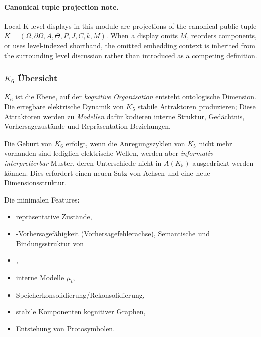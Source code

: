



\paragraph{Canonical tuple projection note.}
Local K-level displays in this module are projections of the canonical public tuple \(K=(\Omega,\partial\Omega,A,\Theta,P,J,C,k,M)\). When a display omits \(M\), reorders components, or uses level-indexed shorthand, the omitted embedding context is inherited from the surrounding level discussion rather than introduced as a competing definition.

\subsubsection{\texorpdfstring{$K_6$}{K_6} Übersicht}
\label{sec:k6-overview}

$K_6$ ist die Ebene, auf der \emph{kognitive Organisation} entsteht
ontologische Dimension. Die erregbare elektrische Dynamik von $K_5$
stabile Attraktoren produzieren; Diese Attraktoren werden zu \emph{Modellen} dafür
kodieren interne Struktur, Gedächtnis, Vorhersagezustände und Repräsentation
Beziehungen.

Die Geburt von $K_6$ erfolgt, wenn die Anregungszyklen von $K_5$ nicht mehr vorhanden sind
lediglich elektrische Wellen, werden aber \emph{informativ interpretierbar}
Muster, deren Unterschiede nicht in $A(K_5)$ ausgedrückt werden können. Dies
erfordert einen neuen Satz von Achsen und eine neue Dimensionsstruktur.

Die minimalen Features:
\begin{itemize}
    \item repräsentative Zustände,
    \item-Vorhersagefähigkeit (Vorhersagefehlerachse),
    Semantische und Bindungsstruktur von \item,
    \item interne Modelle $\mu_t$,
    \item Speicherkonsolidierung/Rekonsolidierung,
    \item stabile Komponenten kognitiver Graphen,
    \item Entstehung von Protosymbolen.
\end{itemize}

